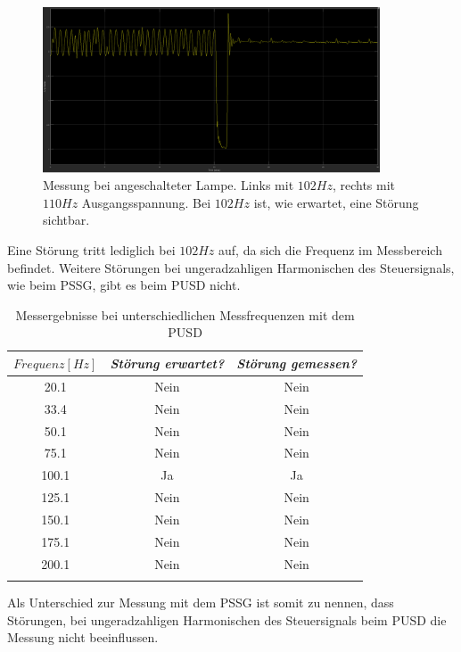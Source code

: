 \documentclass[a4paper,12pt]{article}
\begin{document}
	\begin{figure}[H]
		\centering
		\includegraphics[width=10cm]{assets/pusd_102Hz_110_Hz}
		\caption{Messung bei angeschalteter Lampe. Links mit $102Hz$, rechts mit $110Hz$ Ausgangsspannung. Bei $102Hz$ ist, wie erwartet, eine Störung sichtbar.}
	\end{figure}
	\noindent
	Eine Störung tritt lediglich bei $102Hz$ auf, da sich die Frequenz im Messbereich befindet.\newline
	Weitere Störungen bei ungeradzahligen Harmonischen des Steuersignals, wie beim PSSG, gibt es beim PUSD nicht.\newline
	\newpage
	\begin{longtable}[c]{|c|c|c|}
		\hline
		\textit{$Frequenz [Hz]$} & \textit{Störung erwartet?} & \textit{Störung gemessen?} \\ \hline
		\endfirsthead
		\endhead
		20.1 & Nein & Nein \\ \hline
		33.4 & Nein & Nein \\ \hline
		50.1 & Nein & Nein \\ \hline
		75.1 & Nein & Nein \\ \hline
		100.1 & Ja & Ja \\ \hline
		125.1 & Nein & Nein \\ \hline
		150.1 & Nein & Nein \\ \hline
		175.1 & Nein & Nein \\ \hline
		200.1 & Nein & Nein \\ \hline
		\caption{Messergebnisse bei unterschiedlichen Messfrequenzen mit dem PUSD}
		\label{tab:my-table}\\
	\end{longtable}
	\noindent
	Als Unterschied zur Messung mit dem PSSG ist somit zu nennen, dass Störungen, bei ungeradzahligen Harmonischen des Steuersignals beim PUSD die Messung nicht beeinflussen.\newline
	\newpage
\end{document}
